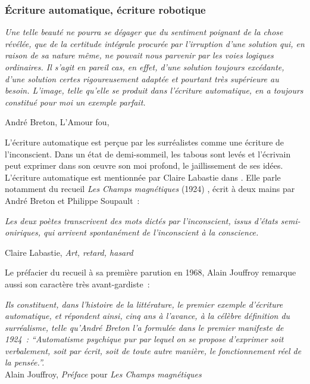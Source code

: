 \documentclass{article}
\newenvironment{citationbox}
{\begin{center}
		\begin{minipage}{.8\textwidth}
		}
		{
		\end{minipage}	
\end{center}
}
\begin{document}
			\subsubsection{\'{E}criture automatique, écriture robotique}\label{ecriture_auto}
				\begin{citationbox}
					\textit{Une telle beauté ne pourra se dégager que du sentiment poignant de la chose révélée, que de la certitude intégrale procurée par l'irruption d'une solution qui, en raison de sa nature même, ne pouvait nous parvenir par les voies logiques ordinaires. Il s'agit en pareil cas, en effet, d'une solution toujours excédante, d'une solution certes rigoureusement adaptée et pourtant très supérieure au besoin. L'image, telle qu'elle se produit dans l'écriture automatique, en a toujours constitué pour moi un exemple parfait.}
					\begin{flushright}
						André Breton, L'Amour fou, \cite{breton1937}
					\end{flushright}
				\end{citationbox}
				L'écriture automatique est perçue par les surréalistes comme une écriture de l'inconscient. Dans un état de demi-sommeil, les tabous sont levés et l'écrivain peut exprimer dans son œuvre son moi profond, le jaillissement de ses idées. L'écriture automatique est mentionnée par Claire Labastie dans \cite{labastie2016}. Elle parle notamment du recueil \textit{Les Champs magnétiques} (1924) \cite{breton1937}, écrit à deux mains par André Breton et Philippe Soupault~:
				\begin{citationbox}
					\textit{Les deux poètes
					transcrivent des mots dictés par l'inconscient, issus d'états semi-oniriques, qui arrivent
					spontanément de l'inconscient à la conscience.}
					\begin{flushright}
						Claire Labastie, \textit{Art, retard, hasard}\cite{labastie2016}
					\end{flushright}
				\end{citationbox}
				Le préfacier du recueil à sa première parution en 1968, Alain Jouffroy remarque aussi son caractère très avant-gardiste~:
				\begin{citationbox}
					\textit{Ils constituent, dans
					l’histoire de la littérature, le premier exemple d’écriture automatique, et
					répondent ainsi, cinq ans à l’avance, à la célèbre définition du
					surréalisme, telle qu’André Breton l’a formulée dans le premier
					manifeste de 1924~: ``Automatisme psychique pur par lequel on se
					propose d’exprimer soit verbalement, soit par écrit, soit de toute autre
					manière, le fonctionnement réel de la pensée.''.}\\
					Alain Jouffroy, \textit{Préface} pour \textit{Les Champs magnétiques}\cite{breton1968}
				\end{citationbox}
				
\end{document}
